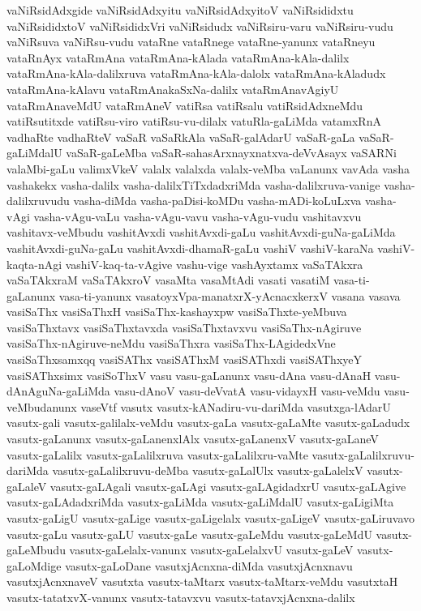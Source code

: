 {vaNiRsidAdxgide
vaNiRsidAdxyitu
vaNiRsidAdxyitoV
vaNiRsididxtu
vaNiRsididxtoV
vaNiRsididxVri
vaNiRsidudx
vaNiRsiru-varu
vaNiRsiru-vudu
vaNiRsuva
vaNiRsu-vudu
vataRne
vataRnege
vataRne-yanunx
vataRneyu
vataRnAyx
vataRmAna
vataRmAna-kAlada
vataRmAna-kAla-dalilx
vataRmAna-kAla-dalilxruva
vataRmAna-kAla-dalolx
vataRmAna-kAladudx
vataRmAna-kAlavu
vataRmAnakaSxNa-dalilx
vataRmAnavAgiyU
vataRmAnaveMdU
vataRmAneV
vatiRsa
vatiRsalu
vatiRsidAdxneMdu
vatiRsutitxde
vatiRsu-viro
vatiRsu-vu-dilalx
vatuRla-gaLiMda
vatamxRnA
vadhaRte
vadhaRteV
vaSaR
vaSaRkAla
vaSaR-galAdarU
vaSaR-gaLa
vaSaR-gaLiMdalU
vaSaR-gaLeMba
vaSaR-sahasArxnayxnatxva-deVvAsayx
vaSARNi
valaMbi-gaLu
valimxVkeV
valalx
valalxda
valalx-veMba
vaLanunx
vavAda
vasha
vashakekx
vasha-dalilx
vasha-dalilxTiTxdadxriMda
vasha-dalilxruva-vanige
vasha-dalilxruvudu
vasha-diMda
vasha-paDisi-koMDu
vasha-mADi-koLuLxva
vasha-vAgi
vasha-vAgu-vaLu
vasha-vAgu-vavu
vasha-vAgu-vudu
vashitavxvu
vashitavx-veMbudu
vashitAvxdi
vashitAvxdi-gaLu
vashitAvxdi-guNa-gaLiMda
vashitAvxdi-guNa-gaLu
vashitAvxdi-dhamaR-gaLu
vashiV
vashiV-karaNa
vashiV-kaqta-nAgi
vashiV-kaq-ta-vAgive
vashu-vige
vashAyxtamx
vaSaTAkxra
vaSaTAkxraM
vaSaTAkxroV
vasaMta
vasaMtAdi
vasati
vasatiM
vasa-ti-gaLanunx
vasa-ti-yanunx
vasatoyxVpa-manatxrX-yAcnacxkerxV
vasana
vasava
vasiSaThx
vasiSaThxH
vasiSaThx-kashayxpw
vasiSaThxte-yeMbuva
vasiSaThxtavx
vasiSaThxtavxda
vasiSaThxtavxvu
vasiSaThx-nAgiruve
vasiSaThx-nAgiruve-neMdu
vasiSaThxra
vasiSaThx-LAgidedxVne
vasiSaThxsamxqq
vasiSAThx
vasiSAThxM
vasiSAThxdi
vasiSAThxyeY
vasiSAThxsimx
vasiSoThxV
vasu
vasu-gaLanunx
vasu-dAna
vasu-dAnaH
vasu-dAnAguNa-gaLiMda
vasu-dAnoV
vasu-deVvatA
vasu-vidayxH
vasu-veMdu
vasu-veMbudanunx
vaseVtf
vasutx
vasutx-kANadiru-vu-dariMda
vasutxga-lAdarU
vasutx-gali
vasutx-galilalx-veMdu
vasutx-gaLa
vasutx-gaLaMte
vasutx-gaLadudx
vasutx-gaLanunx
vasutx-gaLanenxlAlx
vasutx-gaLanenxV
vasutx-gaLaneV
vasutx-gaLalilx
vasutx-gaLalilxruva
vasutx-gaLalilxru-vaMte
vasutx-gaLalilxruvu-dariMda
vasutx-gaLalilxruvu-deMba
vasutx-gaLalUlx
vasutx-gaLalelxV
vasutx-gaLaleV
vasutx-gaLAgali
vasutx-gaLAgi
vasutx-gaLAgidadxrU
vasutx-gaLAgive
vasutx-gaLAdadxriMda
vasutx-gaLiMda
vasutx-gaLiMdalU
vasutx-gaLigiMta
vasutx-gaLigU
vasutx-gaLige
vasutx-gaLigelalx
vasutx-gaLigeV
vasutx-gaLiruvavo
vasutx-gaLu
vasutx-gaLU
vasutx-gaLe
vasutx-gaLeMdu
vasutx-gaLeMdU
vasutx-gaLeMbudu
vasutx-gaLelalx-vanunx
vasutx-gaLelalxvU
vasutx-gaLeV
vasutx-gaLoMdige
vasutx-gaLoDane
vasutxjAcnxna-diMda
vasutxjAcnxnavu
vasutxjAcnxnaveV
vasutxta
vasutx-taMtarx
vasutx-taMtarx-veMdu
vasutxtaH
vasutx-tatatxvX-vanunx
vasutx-tatavxvu
vasutx-tatavxjAcnxna-dalilx
}
